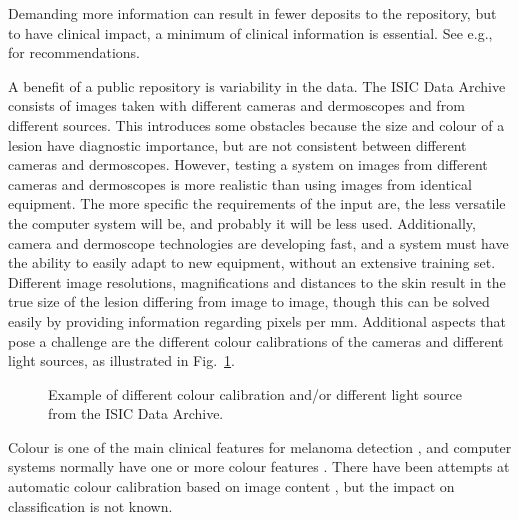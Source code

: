 \documentclass[a4paper,12pt]{article}
\begin{document}
Demanding more information can result in fewer deposits to the repository, but to have clinical impact, a minimum of clinical information is essential. 
See e.g., \citep{Malvehy2007Dermoscopy} for recommendations. 
 



A benefit of a public repository is variability in the data. 
The ISIC Data Archive consists of images taken with different cameras and dermoscopes and from different sources. 
This introduces some obstacles because the size and colour of a lesion have diagnostic importance, but are not consistent between different cameras and dermoscopes. 
However, testing a system on images from different cameras and dermoscopes is more realistic than using images from identical equipment. 
The more specific the requirements of the input are, the less versatile the computer system will be, and probably it will be less used. 
Additionally, camera and dermoscope technologies are developing fast, and a system must have the ability to easily adapt to new equipment, without an extensive training set. 
Different image resolutions, magnifications and distances to the skin result in the true size of the lesion differing from image to image, though this can be solved easily by providing information regarding pixels per mm. 
Additional aspects that pose a challenge are the different colour calibrations of the cameras and different light sources, as illustrated in Fig.~\ref{fig:Colour}. 
  \begin{figure}[h!]
  \centering
        \caption{Example of different colour calibration and/or different light source from the ISIC Data Archive.}
        \label{fig:Colour}
   \end{figure}
Colour is one of the main clinical features for melanoma detection \citep{Argenziano2003Dermoscopy}, and computer systems normally have one or more colour features \citep{Korotkov2012Computerized}. 
There have been attempts at automatic colour calibration based on image content \citep{Iyatomi2011Automated}, but the impact on classification is not known. 
\end{document}

